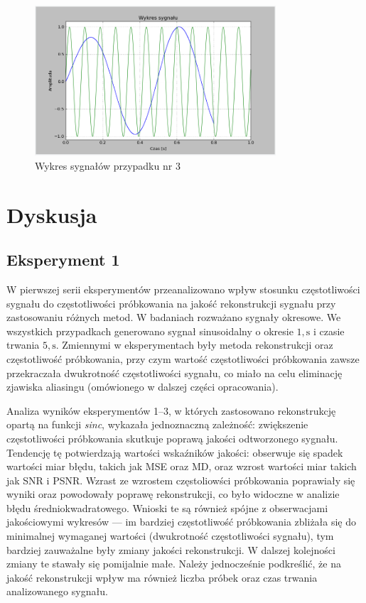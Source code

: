 \documentclass{article}
\begin{document}
    \begin{figure}[h!]
        \centering
        \includegraphics[width=0.8\textwidth]{img/1/anti_3.png}
        \caption{Wykres sygnałów przypadku nr 3}
    \end{figure}
    \FloatBarrier
\section{Dyskusja}
    \subsection{Eksperyment 1}
    W pierwszej serii eksperymentów przeanalizowano wpływ stosunku częstotliwości sygnału do częstotliwości 
    próbkowania na jakość rekonstrukcji sygnału przy zastosowaniu różnych metod. W badaniach rozważano 
    sygnały okresowe. We wszystkich przypadkach generowano sygnał sinusoidalny o okresie 
    $1,\mathrm{s}$ i czasie trwania $5,\mathrm{s}$. Zmiennymi w eksperymentach były metoda rekonstrukcji 
    oraz częstotliwość próbkowania, przy czym wartość częstotliwości próbkowania zawsze przekraczała 
    dwukrotność częstotliwości sygnału, co miało na celu eliminację zjawiska aliasingu (omówionego w dalszej 
    części opracowania).

    Analiza wyników eksperymentów 1–3, w których zastosowano rekonstrukcję opartą na funkcji \emph{sinc}, 
    wykazała jednoznaczną zależność: zwiększenie częstotliwości próbkowania skutkuje poprawą jakości odtworzonego 
    sygnału. Tendencję tę potwierdzają wartości wskaźników jakości: obserwuje się spadek wartości miar błędu, 
    takich jak MSE oraz MD, oraz wzrost wartości miar takich jak SNR i PSNR. Wzrast ze wzrostem częstoliowści
    próbkowania poprawiały się wyniki oraz powodowały poprawę rekonstrukcji, co było widoczne w analizie błędu
    średniokwadratowego. Wnioski te są również spójne z obserwacjami 
    jakościowymi wykresów — im bardziej częstotliwość próbkowania zbliżała się do minimalnej wymaganej wartości 
    (dwukrotność częstotliwości sygnału), tym bardziej zauważalne były zmiany jakości rekonstrukcji. 
    W dalszej kolejności zmiany te stawały się pomijalnie małe. Należy jednocześnie podkreślić, że na jakość 
    rekonstrukcji wpływ ma również liczba próbek oraz czas trwania analizowanego sygnału.
\end{document}
